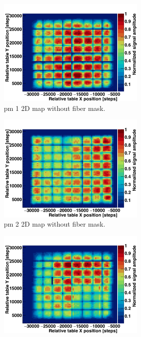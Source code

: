 \begin{figure}
\begin{subfigure}[t]{.5\textwidth}
\centering
\includegraphics[width=0.8\textwidth]{03_GraphicFiles/chapter3_CLaRySproto/Hodoscope/PMchar/Maps_noMask/2DMap_PM1_Norm.png}
\caption{\gls{pm} 1 2D map without fiber mask.}
\label{chap3::fig::hodoPMchar2DnoMask_pm1}
\end{subfigure}
\begin{subfigure}[t]{.5\textwidth}
\centering
\includegraphics[width=0.8\textwidth]{03_GraphicFiles/chapter3_CLaRySproto/Hodoscope/PMchar/Maps_noMask/2DMap_PM2_Norm.png}
\caption{\gls{pm} 2 2D map without fiber mask.}
\label{chap3::fig::hodoPMchar2DnoMask_pm2}
\end{subfigure}
\begin{subfigure}[t]{.5\textwidth}
\centering
\includegraphics[width=0.8\textwidth]{03_GraphicFiles/chapter3_CLaRySproto/Hodoscope/PMchar/Maps_noMask/2DMap_PM3_Norm.png}

\end{subfigure}
\end{figure}
